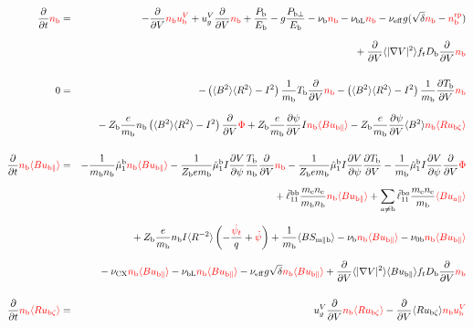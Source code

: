 \documentclass[11pt]{article}
\def\r#1{{\rm#1}}
\def\aves#1{\langle#1\rangle}
\def\dd#1#2{\frac{\partial #1}{\partial #2}}
\def\para{\parallel}
\def\ddV{\frac{\partial}{\partial V}}
\def\psid{\dot{\psi}}
\def\psit{\psi_t}
\def\psitd{\dot{\psit}}
\def\me{m_\r{e}}
\def\mb{m_\r{b}}
\def\nee{n_\r{e}}
\def\nb{n_\r{b}}
\def\Tb{T_\r{b}}
\def\Zb{Z_\r{b}}
\def\Pb{P_\r{b}}
\def\Eb{E_\r{b}}
\def\ubzt{u_{\r{b}\zeta}}
\def\ubpara{u_{\r{b}\para}}
\def\ubV{u_\r{b}^V}
\def\ugV{u_{g}^V}
\def\bri{\aves{B^2}\aves{R^2} - I^2}
\def\ddt{\frac{\partial}{\partial t}}
\def\nbrp{n_\r{b}^\r{rp}}
\def\Pbpara{P_{\r{b}\parallel}}
\def\Pbperp{P_{\r{b}\perp}}
\def\nueff{\nu_\r{eff}}
\def\Db{D_\r{b}}
\def\nunb{\nu_\r{0b}}
\def\nuCX{\nu_\r{CX}}
\def\nub{\nu_\r{b}}
\def\nubL{\nu_\r{bL}}
\def\red#1{\textcolor{red}{#1}}
\begin{document}
%

%
\begin{eqnarray}
  \ddt \red{\nb} &=&
%
  - \ddV \red{\nb\ubV}
%
  + \ugV \ddV \red{\nb}
%
  +  \frac{\Pb}{\Eb}
%
  - g \frac{\Pbperp}{\Eb}
%
  - \nub \red{\nb}
%
  - \nubL \red{\nb}
%
  - \nueff g (\sqrt{\delta} \red{\nb} - \red{\nbrp})
%
\nonumber\\[2.5mm]&&{}
  + \ddV \aves{|\nabla V|^2} f_t \Db \ddV \red{\nb}
%
\\[5mm]
  0 &=&
%
  -           \left( \bri \right) \frac{1}{\mb} \Tb \ddV \red{\nb}
  -           \left( \bri \right) \frac{1}{\mb} \dd{\Tb}{V} \red{\nb}
\nonumber\\[3mm]&&{}
%
  - \Zb \frac{e}{\mb} \nb \left( \bri \right) \ddV \red{\Phi}
%
  + \Zb \frac{e}{\mb} \dd{\psi}{V} I \red{\nb \aves{B\ubpara}}
%
  - \Zb \frac{e}{\mb} \dd{\psi}{V} \aves{B^2} \red{\nb \aves{R\ubzt}}
\\[5mm]
  \ddt \red{\nb \aves{B \ubpara}} &=&
%
  - \frac{1}{\mb \nb} \hat{\mu}_1^\r{b} \red{\nb \aves{B \ubpara}}
%
  - \frac{1}{\Zb e\mb} \hat{\mu}_1^\r{b} I \dd{V}{\psi} \frac{\Tb}{\nb}
  \ddV \red{\nb}
  - \frac{1}{\Zb e\mb} \hat{\mu}_1^\r{b} I \dd{V}{\psi} \dd{\Tb}{V}
  - \frac{1}{\mb} \hat{\mu}_1^\r{b} I \dd{V}{\psi} \ddV \red{\Phi}
\nonumber\\[2.5mm]&&{}
%
  + \hat{\ell}_{11}^\r{bb} \frac{\me\nee}{\mb\nb} \red{\nb \aves{B \ubpara}}
%
  + \sum_{a\neq\r{b}} \hat{\ell}_{11}^{\r{b}a} \frac{\me\nee}{\mb} \red{\aves{B u_{a\para}}}
\nonumber\\[2.5mm]&&{}
%
  + \Zb \frac{e}{\mb} \nb I \aves{R^{-2}} \left( - \frac{\red{\psitd}}{q} + \red{\psid} \right)
%
  + \frac{1}{\mb} \aves{B S_{\r{m}\para\r{b}}}
%
  - \nub  \red{\nb \aves{B \ubpara}}
%
  - \nunb \red{\nb \aves{B\ubpara}}
\nonumber\\[2.5mm]&&{}
%
  - \nuCX \red{\nb \aves{B\ubpara}}
%
%
  - \nubL \red{\nb \aves{B\ubpara}}
%
  - \nueff g \sqrt{\delta} \red{\nb \aves{B\ubpara}}
%
  + \ddV \aves{|\nabla V|^2} \aves{B\ubpara} f_t \Db \ddV \red{\nb}
\\[5mm]
  \ddt \red{\nb \aves{R \ubzt}} &=&
%
  \ugV \ddV \red{\nb \aves{R \ubzt}}
%
  - \ddV \aves{R \ubzt} \red{\nb \ubV} 
%

\end{eqnarray}
\end{document}
